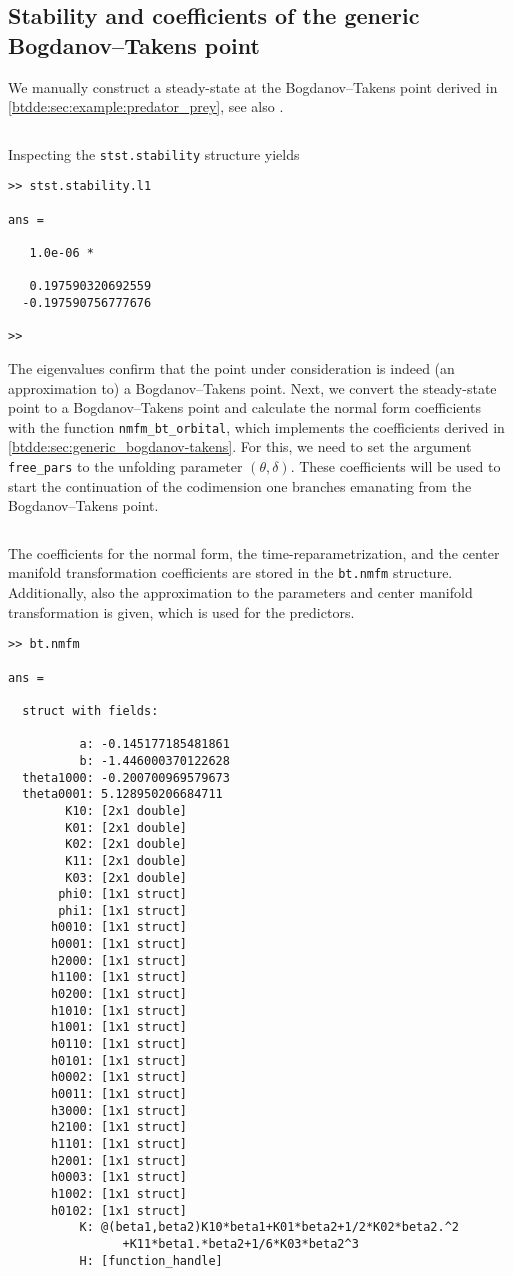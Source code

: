 \subsection{Stability and coefficients of the generic Bogdanov--Takens point}
We manually construct a steady-state at the Bogdanov--Takens point derived in
\cref{btdde:sec:example:predator_prey}, see also \cite{Jiao2021}.
\inputminted[firstline=42, lastline=55]{MATLAB}{\pathToDDEBifToolDemos/predator_prey/predator_prey.m}
Inspecting the \texttt{stst.stability} structure yields
\begin{verbatim}
>> stst.stability.l1

ans =

   1.0e-06 *

   0.197590320692559
  -0.197590756777676

>> 
\end{verbatim}

The eigenvalues confirm that the point under consideration is indeed (an
approximation to) a Bogdanov--Takens point. Next, we convert the steady-state
point to a Bogdanov--Takens point and calculate the normal form coefficients
with the function \texttt{nmfm_bt_orbital}, which implements the coefficients
derived in \cref{btdde:sec:generic_bogdanov-takens}. For this, we need to set the argument
\texttt{free_pars} to the unfolding parameter $(\theta,\delta)$. These
coefficients will be used to start the continuation of the codimension one branches
emanating from the Bogdanov--Takens point.
\inputminted[firstline=57, lastline=60]{MATLAB}{\pathToDDEBifToolDemos/predator_prey/predator_prey.m}
The coefficients for the normal form, the time-reparametrization, and the center
manifold transformation coefficients are stored in the \texttt{bt.nmfm}
structure. Additionally, also the approximation to the parameters and center
manifold transformation is given, which is used for the predictors.
\begin{verbatim}
>> bt.nmfm

ans =

  struct with fields:

          a: -0.145177185481861
          b: -1.446000370122628
  theta1000: -0.200700969579673
  theta0001: 5.128950206684711
        K10: [2x1 double]
        K01: [2x1 double]
        K02: [2x1 double]
        K11: [2x1 double]
        K03: [2x1 double]
       phi0: [1x1 struct]
       phi1: [1x1 struct]
      h0010: [1x1 struct]
      h0001: [1x1 struct]
      h2000: [1x1 struct]
      h1100: [1x1 struct]
      h0200: [1x1 struct]
      h1010: [1x1 struct]
      h1001: [1x1 struct]
      h0110: [1x1 struct]
      h0101: [1x1 struct]
      h0002: [1x1 struct]
      h0011: [1x1 struct]
      h3000: [1x1 struct]
      h2100: [1x1 struct]
      h1101: [1x1 struct]
      h2001: [1x1 struct]
      h0003: [1x1 struct]
      h1002: [1x1 struct]
      h0102: [1x1 struct]
          K: @(beta1,beta2)K10*beta1+K01*beta2+1/2*K02*beta2.^2
                +K11*beta1.*beta2+1/6*K03*beta2^3
          H: [function_handle]
\end{verbatim}


